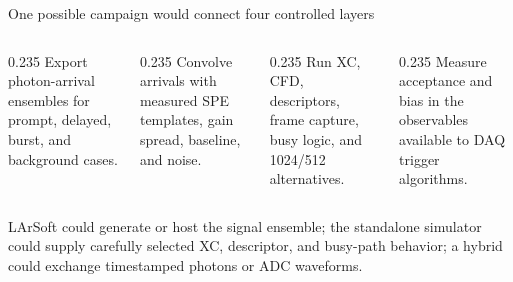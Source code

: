 \documentclass[aspectratio=169,11pt]{beamer}
\begin{document}
\begin{frame}{One possible campaign would connect four controlled layers}
  \begin{columns}[T,onlytextwidth]
    \begin{column}{0.235\textwidth}
        {Export photon-arrival ensembles for prompt, delayed, burst, and background cases.}
    \end{column}
    \begin{column}{0.235\textwidth}
        {Convolve arrivals with measured SPE templates, gain spread, baseline, and noise.}
    \end{column}
    \begin{column}{0.235\textwidth}
        {Run XC, CFD, descriptors, frame capture, busy logic, and 1024/512 alternatives.}
    \end{column}
    \begin{column}{0.235\textwidth}
        {Measure acceptance and bias in the observables available to DAQ trigger algorithms.}
    \end{column}
  \end{columns}

  \smallskip
    {LArSoft could generate or host the signal ensemble; the standalone simulator could supply carefully selected XC, descriptor, and busy-path behavior; a hybrid could exchange timestamped photons or ADC waveforms.}
\end{frame}
\end{document}
